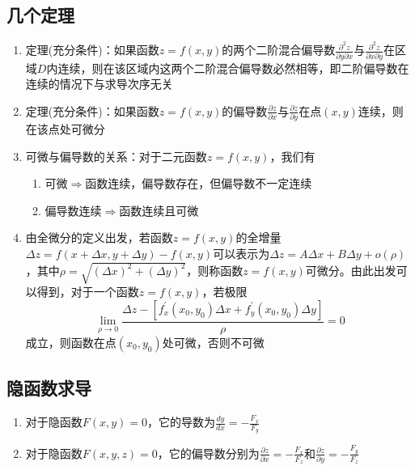 \documentclass[12pt,a4paper,UTF8]{book}
\begin{document}
\subsection{几个定理}
\begin{enumerate}
\item 定理(充分条件)：如果函数$z=f\left(x,y\right)$的两个二阶混合偏导数$\frac{\partial^2z}{\partial y\partial x}$与$\frac{\partial^2z}{\partial x\partial y}$在区域$D$内连续，则在该区域内这两个二阶混合偏导数必然相等，即二阶偏导数在连续的情况下与求导次序无关
\item 定理(充分条件)：如果函数$z=f\left(x,y\right)$的偏导数$\frac{\partial z}{\partial x}$与$\frac{\partial z}{\partial y}$在点$\left(x,y\right)$连续，则在该点处可微分
\item 可微与偏导数的关系：对于二元函数$z=f\left(x,y\right)$，我们有
\begin{enumerate}
\item 可微$\Rightarrow$函数连续，偏导数存在，但偏导数不一定连续
\item 偏导数连续$\Rightarrow$函数连续且可微
\end{enumerate}
\item 由全微分的定义出发，若函数$z=f\left(x,y\right)$的全增量$\Delta z=f\left(x+\Delta x,y+\Delta y\right)-f\left(x,y\right)$可以表示为$\Delta z=A\Delta x+B\Delta y+o\left(\rho\right)$，其中$\rho=\sqrt{\left(\Delta x\right)^2+\left(\Delta y\right)^2}$，则称函数$z=f\left(x,y\right)$可微分。由此出发可以得到，对于一个函数$z=f\left(x,y\right)$，若极限
\[\lim\limits_{\rho\to0}\frac{\Delta z-\left[f_x^{\prime}\left(x_0,y_0\right)\Delta x+f_y^{\prime}\left(x_0,y_0\right)\Delta y\right]}{\rho}=0\]
成立，则函数在点$\left(x_0,y_0\right)$处可微，否则不可微
\end{enumerate}

\subsection{隐函数求导}
\begin{enumerate}
\item 对于隐函数$F\left(x,y\right)=0$，它的导数为$\frac{dy}{dx}=-\frac{F_x}{F_y}$
\item 对于隐函数$F\left(x,y,z\right)=0$，它的偏导数分别为$\frac{\partial z}{\partial x}=-\frac{F_x}{F_z}$和$\frac{\partial z}{\partial y}=-\frac{F_y}{F_z}$
\end{enumerate}
\end{document}
